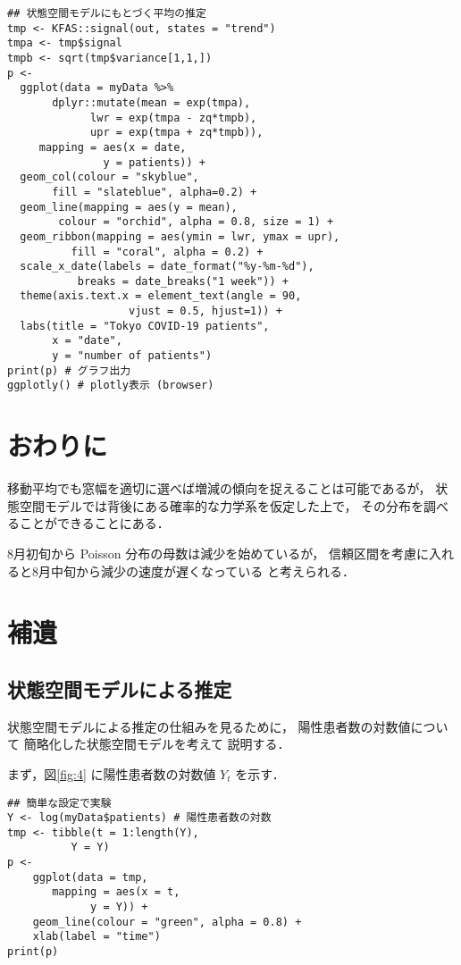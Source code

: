 \documentclass[10pt,oneside,fleqn]{scrartcl}
\begin{document}
\begin{verbatim}
## 状態空間モデルにもとづく平均の推定
tmp <- KFAS::signal(out, states = "trend")
tmpa <- tmp$signal
tmpb <- sqrt(tmp$variance[1,1,])
p <-
  ggplot(data = myData %>%
	   dplyr::mutate(mean = exp(tmpa),
			 lwr = exp(tmpa - zq*tmpb),
			 upr = exp(tmpa + zq*tmpb)),
	 mapping = aes(x = date,
		       y = patients)) +
  geom_col(colour = "skyblue",
	   fill = "slateblue", alpha=0.2) + 
  geom_line(mapping = aes(y = mean),
	    colour = "orchid", alpha = 0.8, size = 1) +
  geom_ribbon(mapping = aes(ymin = lwr, ymax = upr),
	      fill = "coral", alpha = 0.2) +
  scale_x_date(labels = date_format("%y-%m-%d"), 
	       breaks = date_breaks("1 week")) + 
  theme(axis.text.x = element_text(angle = 90, 
				   vjust = 0.5, hjust=1)) +
  labs(title = "Tokyo COVID-19 patients",
       x = "date",
       y = "number of patients")
print(p) # グラフ出力
ggplotly() # plotly表示 (browser)
\end{verbatim}

\section{おわりに}
\label{sec:orgd991ff8}

移動平均でも窓幅を適切に選べば増減の傾向を捉えることは可能であるが，
状態空間モデルでは背後にある確率的な力学系を仮定した上で，
その分布を調べることができることにある．

8月初旬から Poisson 分布の母数は減少を始めているが，
信頼区間を考慮に入れると8月中旬から減少の速度が遅くなっている
と考えられる．

\section{補遺}
\label{sec:org67708c8}
\subsection{状態空間モデルによる推定}
\label{sec:orga16f9a4}

状態空間モデルによる推定の仕組みを見るために，
陽性患者数の対数値について
簡略化した状態空間モデルを考えて
説明する．

まず，図\ref{fig:4} に陽性患者数の対数値 \(Y_{t}\) を示す．
\begin{figure}[htbp]
  \centering
  \myGraph*{}
\end{figure}

\begin{verbatim}
## 簡単な設定で実験
Y <- log(myData$patients) # 陽性患者数の対数
tmp <- tibble(t = 1:length(Y),
	      Y = Y)
p <- 
    ggplot(data = tmp, 
	   mapping = aes(x = t,
			 y = Y)) +
    geom_line(colour = "green", alpha = 0.8) +
    xlab(label = "time")
print(p)
\end{verbatim}
\end{document}
